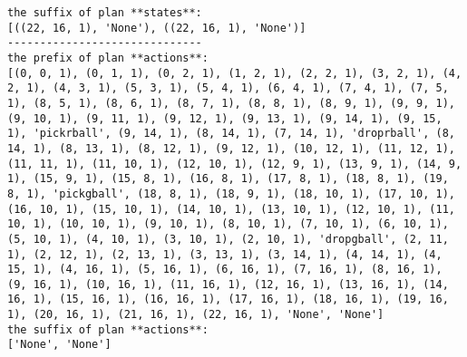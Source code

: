 \begin{lstlisting}
the suffix of plan **states**:
[((22, 16, 1), 'None'), ((22, 16, 1), 'None')]
------------------------------
the prefix of plan **actions**:
[(0, 0, 1), (0, 1, 1), (0, 2, 1), (1, 2, 1), (2, 2, 1), (3, 2, 1), (4, 2, 1), (4, 3, 1), (5, 3, 1), (5, 4, 1), (6, 4, 1), (7, 4, 1), (7, 5, 1), (8, 5, 1), (8, 6, 1), (8, 7, 1), (8, 8, 1), (8, 9, 1), (9, 9, 1), (9, 10, 1), (9, 11, 1), (9, 12, 1), (9, 13, 1), (9, 14, 1), (9, 15, 1), 'pickrball', (9, 14, 1), (8, 14, 1), (7, 14, 1), 'droprball', (8, 14, 1), (8, 13, 1), (8, 12, 1), (9, 12, 1), (10, 12, 1), (11, 12, 1), (11, 11, 1), (11, 10, 1), (12, 10, 1), (12, 9, 1), (13, 9, 1), (14, 9, 1), (15, 9, 1), (15, 8, 1), (16, 8, 1), (17, 8, 1), (18, 8, 1), (19, 8, 1), 'pickgball', (18, 8, 1), (18, 9, 1), (18, 10, 1), (17, 10, 1), (16, 10, 1), (15, 10, 1), (14, 10, 1), (13, 10, 1), (12, 10, 1), (11, 10, 1), (10, 10, 1), (9, 10, 1), (8, 10, 1), (7, 10, 1), (6, 10, 1), (5, 10, 1), (4, 10, 1), (3, 10, 1), (2, 10, 1), 'dropgball', (2, 11, 1), (2, 12, 1), (2, 13, 1), (3, 13, 1), (3, 14, 1), (4, 14, 1), (4, 15, 1), (4, 16, 1), (5, 16, 1), (6, 16, 1), (7, 16, 1), (8, 16, 1), (9, 16, 1), (10, 16, 1), (11, 16, 1), (12, 16, 1), (13, 16, 1), (14, 16, 1), (15, 16, 1), (16, 16, 1), (17, 16, 1), (18, 16, 1), (19, 16, 1), (20, 16, 1), (21, 16, 1), (22, 16, 1), 'None', 'None']
the suffix of plan **actions**:
['None', 'None']
\end{lstlisting}


